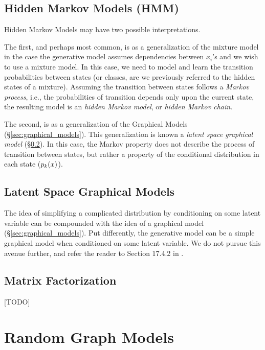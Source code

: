 \subsection{Hidden Markov Models (HMM)}
\label{sec:hmm}
Hidden Markov Models may have two possible interpretations.

The first, and perhaps most common, is as a generalization of the mixture model in the case the generative model assumes dependencies between $x_i$'s and we wish to use a mixture model. 
In this case, we need to model and learn the transition probabilities between states (or classes, are we previously referred to the hidden states of a mixture). 
Assuming the transition between states follows a \emph{Markov process}, i.e., the probabilities of transition depends only upon the current state, the resulting model is an \emph{hidden Markov model}, or \emph{hidden Markov chain}.

The second, is as a generalization of the Graphical Models (\S\ref{sec:graphical_models}). 
This generalization is known a \emph{latent space graphical model} (\S\ref{sec:latent_graphical}). 
In this case, the Markov property does not describe the process of transition between states, but rather a property of the conditional distribution in each state ($p_k(x)$). 




\subsection{Latent Space Graphical Models}
\label{sec:latent_graphical}

The idea of simplifying a complicated distribution by conditioning on some latent variable can be compounded with the idea of a graphical model (\S\ref{sec:graphical_models}). 
Put differently, the generative model can be a simple graphical model when conditioned on some latent variable.
We do not pursue this avenue further, and refer the reader to Section 17.4.2 in \cite{hastie_elements_2003}.





\subsection{Matrix Factorization}
\label{sec:matrix_factorization}
[TODO]




\section{Random Graph Models}
\label{sec:random_graphs}

